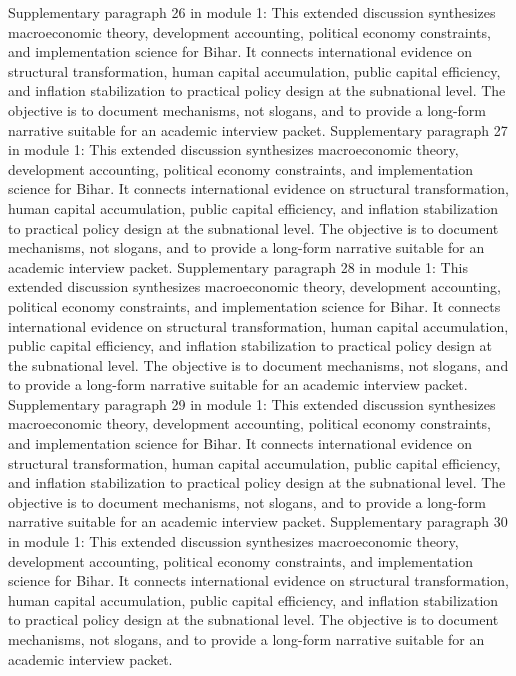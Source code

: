 \documentclass[preprint,12pt]{elsarticle}
\begin{document}
Supplementary paragraph 26 in module 1: This extended discussion synthesizes macroeconomic theory, development accounting, political economy constraints, and implementation science for Bihar. It connects international evidence on structural transformation, human capital accumulation, public capital efficiency, and inflation stabilization to practical policy design at the subnational level. The objective is to document mechanisms, not slogans, and to provide a long-form narrative suitable for an academic interview packet.
Supplementary paragraph 27 in module 1: This extended discussion synthesizes macroeconomic theory, development accounting, political economy constraints, and implementation science for Bihar. It connects international evidence on structural transformation, human capital accumulation, public capital efficiency, and inflation stabilization to practical policy design at the subnational level. The objective is to document mechanisms, not slogans, and to provide a long-form narrative suitable for an academic interview packet.
Supplementary paragraph 28 in module 1: This extended discussion synthesizes macroeconomic theory, development accounting, political economy constraints, and implementation science for Bihar. It connects international evidence on structural transformation, human capital accumulation, public capital efficiency, and inflation stabilization to practical policy design at the subnational level. The objective is to document mechanisms, not slogans, and to provide a long-form narrative suitable for an academic interview packet.
Supplementary paragraph 29 in module 1: This extended discussion synthesizes macroeconomic theory, development accounting, political economy constraints, and implementation science for Bihar. It connects international evidence on structural transformation, human capital accumulation, public capital efficiency, and inflation stabilization to practical policy design at the subnational level. The objective is to document mechanisms, not slogans, and to provide a long-form narrative suitable for an academic interview packet.
Supplementary paragraph 30 in module 1: This extended discussion synthesizes macroeconomic theory, development accounting, political economy constraints, and implementation science for Bihar. It connects international evidence on structural transformation, human capital accumulation, public capital efficiency, and inflation stabilization to practical policy design at the subnational level. The objective is to document mechanisms, not slogans, and to provide a long-form narrative suitable for an academic interview packet.
\end{document}
